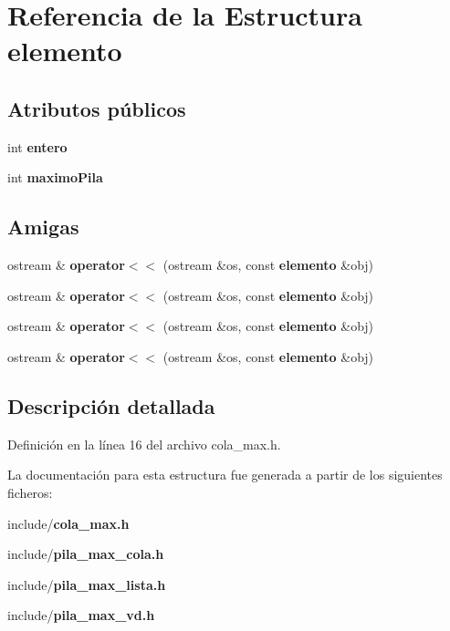 \section{Referencia de la Estructura elemento}
\label{structelemento}
\subsection*{Atributos públicos}
\begin{DoxyCompactItemize}
\item 
int {\bfseries entero}\label{structelemento_a1a35d81697b20401a0eb5afafd71a5af}

\item 
int {\bfseries maximo\-Pila}\label{structelemento_a7656fd92ae6bae728dcbc4e37a7e7127}

\end{DoxyCompactItemize}
\subsection*{Amigas}
\begin{DoxyCompactItemize}
\item 
ostream \& {\bfseries operator$<$$<$} (ostream \&os, const {\bf elemento} \&obj)\label{structelemento_add9d7e8b569d02e1e20f1b7bc52553f7}

\item 
ostream \& {\bfseries operator$<$$<$} (ostream \&os, const {\bf elemento} \&obj)\label{structelemento_add9d7e8b569d02e1e20f1b7bc52553f7}

\item 
ostream \& {\bfseries operator$<$$<$} (ostream \&os, const {\bf elemento} \&obj)\label{structelemento_add9d7e8b569d02e1e20f1b7bc52553f7}

\item 
ostream \& {\bfseries operator$<$$<$} (ostream \&os, const {\bf elemento} \&obj)\label{structelemento_add9d7e8b569d02e1e20f1b7bc52553f7}

\end{DoxyCompactItemize}


\subsection{Descripción detallada}


Definición en la línea 16 del archivo cola\-\_\-max.\-h.



La documentación para esta estructura fue generada a partir de los siguientes ficheros\-:\begin{DoxyCompactItemize}
\item 
include/{\bf cola\-\_\-max.\-h}\item 
include/{\bf pila\-\_\-max\-\_\-cola.\-h}\item 
include/{\bf pila\-\_\-max\-\_\-lista.\-h}\item 
include/{\bf pila\-\_\-max\-\_\-vd.\-h}\end{DoxyCompactItemize}
